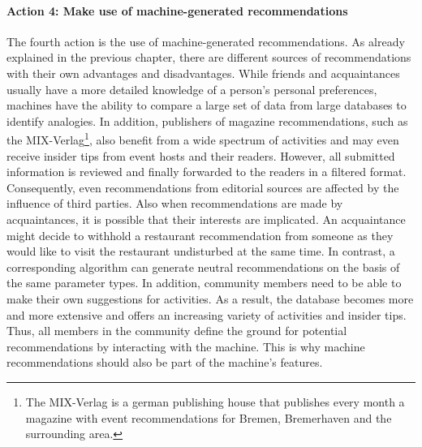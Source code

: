 \documentclass[12pt,numbers=noenddot,parskip,bibliography=totocnumbered,listof=totocnumbered,draft=true]{scrreprt}
\begin{document}
\paragraph{Action 4: Make use of machine-generated recommendations}
The fourth action is the use of machine-generated recommendations. As already explained in the previous chapter, there are different sources of recommendations with their own advantages and disadvantages. While friends and acquaintances usually have a more detailed knowledge of a person's personal preferences, machines have the ability to compare a large set of data from large databases to identify analogies. In addition, publishers of magazine recommendations, such as the MIX-Verlag\footnote{The MIX-Verlag is a german publishing house that publishes every month a magazine with event recommendations for Bremen, Bremerhaven and the surrounding area.}, also benefit from a wide spectrum of activities and may even receive insider tips from event hosts and their readers. However, all submitted information is reviewed and finally forwarded to the readers in a filtered format. Consequently, even recommendations from editorial sources are affected by the influence of third parties. Also when recommendations are made by acquaintances, it is possible that their interests are implicated. An acquaintance might decide to withhold a restaurant recommendation from someone as they would like to visit the restaurant undisturbed at the same time.\newline
In contrast, a corresponding algorithm can generate neutral recommendations on the basis of the same parameter types. In addition, community members need to be able to make their own suggestions for activities. As a result, the database becomes more and more extensive and offers an increasing variety of activities and insider tips. Thus, all members in the community define the ground for potential recommendations by interacting with the machine. This is why machine recommendations should also be part of the machine's features.
\end{document}
